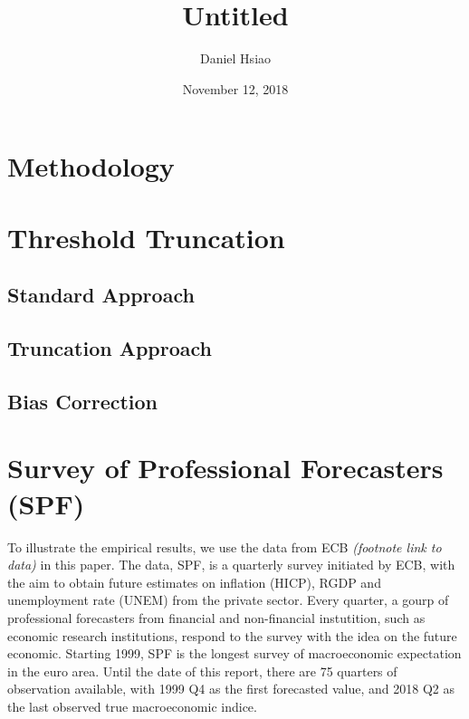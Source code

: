 \documentclass[]{article}
\title{Untitled}
\author{Daniel Hsiao}
\date{November 12, 2018}
\begin{document}
\maketitle

{
\setcounter{tocdepth}{3}
\tableofcontents
}
\newpage

\hypertarget{methodology}{%
\section{Methodology}\label{methodology}}

\hypertarget{threshold-truncation}{%
\section{Threshold Truncation}\label{threshold-truncation}}

\hypertarget{standard-approach}{%
\subsection{Standard Approach}\label{standard-approach}}

\hypertarget{truncation-approach}{%
\subsection{Truncation Approach}\label{truncation-approach}}

\hypertarget{bias-correction}{%
\subsection{Bias Correction}\label{bias-correction}}

\hypertarget{survey-of-professional-forecasters-spf}{%
\section{Survey of Professional Forecasters
(SPF)}\label{survey-of-professional-forecasters-spf}}

To illustrate the empirical results, we use the data from ECB
\emph{(footnote link to data)} in this paper. The data, SPF, is a
quarterly survey initiated by ECB, with the aim to obtain future
estimates on inflation (HICP), RGDP and unemployment rate (UNEM) from
the private sector. Every quarter, a gourp of professional forecasters
from financial and non-financial instutition, such as economic research
institutions, respond to the survey with the idea on the future
economic. Starting 1999, SPF is the longest survey of macroeconomic
expectation in the euro area. Until the date of this report, there are
75 quarters of observation available, with 1999 Q4 as the first
forecasted value, and 2018 Q2 as the last observed true macroeconomic
indice.
\end{document}
